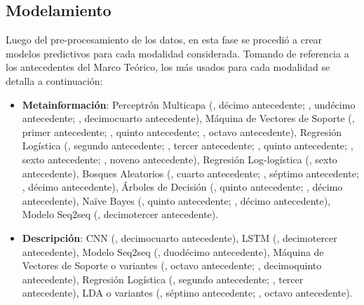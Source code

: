 \subsection{Modelamiento}
Luego del pre-procesamiento de los datos, en esta fase se procedió a crear modelos predictivos para cada modalidad considerada. Tomando de referencia a los antecedentes del Marco Teórico, los más usados para cada modalidad se detalla a continuación:
\begin{itemize}
	\item \textbf{Metainformación}: Perceptrón Multicapa (\citeauthor{pr_kamath2018suplearn}, décimo antecedente; \citeauthor{pr_yu2018deeplearning}, undécimo antecedente; \citeauthor{pr_cheng2019deeplearning}, decimocuarto antecedente), Máquina de Vectores de Soporte (\citeauthor{pr_chen2013kickpredict}, primer antecedente; \citeauthor{pr_beckwith2016predcrowd}, quinto antecedente; \citeauthor{pr_sawhney2016usingLT}, octavo antecedente), Regresión Logística (\citeauthor{pr_mitra2014phrases}, segundo antecedente; \citeauthor{pr_zhou2015projectdesc}, tercer antecedente; \citeauthor{pr_beckwith2016predcrowd}, quinto antecedente; \citeauthor{pr_li2016predcrowd}, sexto antecedente; \citeauthor{pr_kaur2017socmedcrowd}, noveno antecedente), Regresión Log-logística (\citeauthor{pr_li2016predcrowd}, sexto antecedente), Bosques Aleatorios (\citeauthor{pr_chen2015predcrowd}, cuarto antecedente; \citeauthor{pr_yuan2016textanalytics}, séptimo antecedente; \citeauthor{pr_kamath2018suplearn}, décimo antecedente), Árboles de Decisión (\citeauthor{pr_beckwith2016predcrowd}, quinto antecedente; \citeauthor{pr_kamath2018suplearn}, décimo antecedente), Naïve Bayes (\citeauthor{pr_beckwith2016predcrowd}, quinto antecedente; \citeauthor{pr_kamath2018suplearn}, décimo antecedente), Modelo Seq2seq (\citeauthor{pr_jin2019dayssuccess}, decimotercer antecedente).
	\item \textbf{Descripción}: CNN (\citeauthor{pr_cheng2019deeplearning}, decimocuarto antecedente), LSTM (\citeauthor{pr_jin2019dayssuccess}, decimotercer antecedente), Modelo Seq2seq (\citeauthor{pr_lee2018contentDL}, duodécimo antecedente), Máquina de Vectores de Soporte o variantes (\citeauthor{pr_sawhney2016usingLT}, octavo antecedente; \citeauthor{pr_chen2019keywords_crowdfunding}, decimoquinto antecedente), Regresión Logística (\citeauthor{pr_mitra2014phrases}, segundo antecedente; \citeauthor{pr_zhou2015projectdesc}, tercer antecedente), LDA o variantes (\citeauthor{pr_yuan2016textanalytics}, séptimo antecedente; \citeauthor{pr_sawhney2016usingLT}, octavo antecedente).

\end{itemize}
